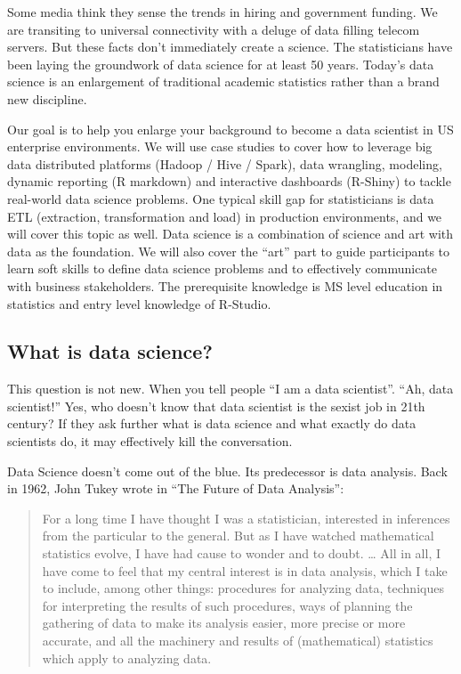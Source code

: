 \documentclass[
]{article}
\begin{document}
Some media think they sense the trends in hiring and government funding.
We are transiting to universal connectivity with a deluge of data
filling telecom servers. But these facts don't immediately create a
science. The statisticians have been laying the groundwork of data
science for at least 50 years. Today's data science is an enlargement of
traditional academic statistics rather than a brand new discipline.

Our goal is to help you enlarge your background to become a data
scientist in US enterprise environments. We will use case studies to
cover how to leverage big data distributed platforms (Hadoop / Hive /
Spark), data wrangling, modeling, dynamic reporting (R markdown) and
interactive dashboards (R-Shiny) to tackle real-world data science
problems. One typical skill gap for statisticians is data ETL
(extraction, transformation and load) in production environments, and we
will cover this topic as well. Data science is a combination of science
and art with data as the foundation. We will also cover the ``art'' part
to guide participants to learn soft skills to define data science
problems and to effectively communicate with business stakeholders. The
prerequisite knowledge is MS level education in statistics and entry
level knowledge of R-Studio.

\hypertarget{what-is-data-science}{%
\subsection{What is data science?}\label{what-is-data-science}}

This question is not new. When you tell people ``I am a data
scientist''. ``Ah, data scientist!'' Yes, who doesn't know that data
scientist is the sexist job in 21th century? If they ask further what is
data science and what exactly do data scientists do, it may effectively
kill the conversation.

Data Science doesn't come out of the blue. Its predecessor is data
analysis. Back in 1962, John Tukey wrote in ``The Future of Data
Analysis'':

\begin{quote}
For a long time I have thought I was a statistician, interested in
inferences from the particular to the general. But as I have watched
mathematical statistics evolve, I have had cause to wonder and to doubt.
\ldots{} All in all, I have come to feel that my central interest is in
data analysis, which I take to include, among other things: procedures
for analyzing data, techniques for interpreting the results of such
procedures, ways of planning the gathering of data to make its analysis
easier, more precise or more accurate, and all the machinery and results
of (mathematical) statistics which apply to analyzing data.
\end{quote}
\end{document}
